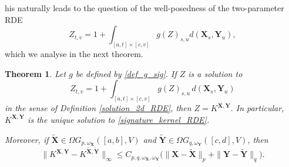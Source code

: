 \documentclass{article}%
\newtheorem{theorem}{Theorem}
\begin{document}
his naturally leads to the question of the well-posedness of the two-parameter RDE 
\[
Z_{t,v} = 1 +\int_{[a,t] \times [c, v]}   g(Z)_{s,u} d\left(\mathbf{X}_s, \mathbf{Y}_u\right),
\]
which we analyse in the next theorem.

\begin{theorem}\label{uniqueness_sig_kernel}
Let \(g\) be defined by \eqref{def_g_sig}. If \(Z\) is a solution to
\begin{equation}\label{signature_kernel_RDE}
Z_{t,v}
=
1+\int_{[a,t]\times[c,v]} g(Z)_{s,u}\,d(\mathbf{X}_s,\mathbf{Y}_u)
\end{equation}
in the sense of Definition \ref{solution_2d_RDE}, then
\(
Z = K^{\mathbf{X},\mathbf{Y}}.
\)
In particular, \(K^{\mathbf{X},\mathbf{Y}}\) is the unique solution to \eqref{signature_kernel_RDE}.

Moreover, if \(\tilde{\mathbf{X}} \in \Omega G_{p,\omega_{\mathbf{X}}}([a,b],V)\) and
\(\tilde{\mathbf{Y}} \in \Omega G_{q,\omega_{\mathbf{Y}}}([c,d],V)\), then
\[
\|K^{\mathbf{X},\mathbf{Y}}-K^{\tilde{\mathbf{X}},\tilde{\mathbf{Y}}}\|_{\infty}
\leq
C_{p,q,\omega_{\mathbf{X}},\omega_{\mathbf{Y}}}
\big(
\|\mathbf{X}-\tilde{\mathbf{X}}\|_{p}
+
\|\mathbf{Y}-\tilde{\mathbf{Y}}\|_{q}
\big).
\]
\end{theorem}
\end{document}
